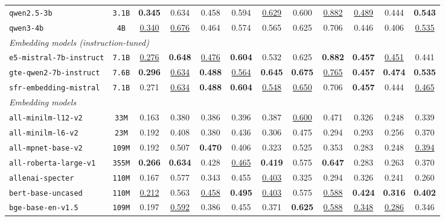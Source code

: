 \documentclass[11pt]{article}
\begin{document}
\begin{table}[h!]
{\begin{tabular}{lccccccccccc}
\texttt{qwen2.5-3b} & \texttt{3.1B} & \textbf{0.345} & 0.634 & 0.458 & 0.594 & \underline{0.629} & 0.600 & \underline{0.882} & \underline{0.489} & 0.444 & \textbf{0.543} \\
\texttt{qwen3-4b} & \texttt{4B} & \underline{0.340} & \underline{0.676} & 0.464 & 0.574 & 0.565 & 0.625 & 0.706 & 0.446 & 0.406 & \underline{0.535} \\
\midrule
\multicolumn{12}{l}{\textit{Embedding models (instruction-tuned)}} \\
\midrule
\texttt{e5-mistral-7b-instruct} & \texttt{7.1B} & \underline{0.276} & \textbf{0.648} & \underline{0.476} & \textbf{0.604} & 0.532 & 0.625 & \textbf{0.882} & \textbf{0.457} & \underline{0.451} & 0.441 \\
\texttt{gte-qwen2-7b-instruct} & \texttt{7.6B} & \textbf{0.296} & \underline{0.634} & \textbf{0.488} & \underline{0.564} & \textbf{0.645} & \textbf{0.675} & \underline{0.765} & \textbf{0.457} & \textbf{0.474} & \textbf{0.535} \\
\texttt{sfr-embedding-mistral} & \texttt{7.1B} & 0.271 & \underline{0.634} & \textbf{0.488} & \textbf{0.604} & \underline{0.548} & \underline{0.650} & 0.706 & \textbf{0.457} & 0.444 & \underline{0.465} \\
\midrule
\multicolumn{12}{l}{\textit{Embedding models}} \\
\midrule
\texttt{all-minilm-l12-v2} & \texttt{33M} & 0.163 & 0.380 & 0.386 & 0.396 & 0.387 & \underline{0.600} & 0.471 & 0.326 & 0.248 & 0.339 \\
\texttt{all-minilm-l6-v2} & \texttt{23M} & 0.192 & 0.408 & 0.380 & 0.436 & 0.306 & 0.475 & 0.294 & 0.293 & 0.256 & 0.370 \\
\texttt{all-mpnet-base-v2} & \texttt{109M} & 0.192 & 0.507 & \textbf{0.470} & 0.406 & 0.323 & 0.525 & 0.353 & 0.283 & 0.248 & \underline{0.394} \\
\texttt{all-roberta-large-v1} & \texttt{355M} & \textbf{0.266} & \textbf{0.634} & 0.428 & \underline{0.465} & \textbf{0.419} & 0.575 & \textbf{0.647} & 0.283 & 0.263 & 0.370 \\
\texttt{allenai-specter} & \texttt{110M} & 0.167 & 0.577 & 0.343 & 0.455 & \underline{0.403} & 0.325 & 0.294 & 0.326 & 0.241 & 0.260 \\
\texttt{bert-base-uncased} & \texttt{110M} & \underline{0.212} & 0.563 & \underline{0.458} & \textbf{0.495} & \underline{0.403} & 0.575 & \underline{0.588} & \textbf{0.424} & \textbf{0.316} & \textbf{0.402} \\
\texttt{bge-base-en-v1.5} & \texttt{109M} & 0.197 & \underline{0.592} & 0.386 & 0.455 & 0.371 & \textbf{0.625} & \underline{0.588} & \underline{0.348} & \underline{0.286} & 0.346 \\

\end{tabular}}
\end{table}
\end{document}
